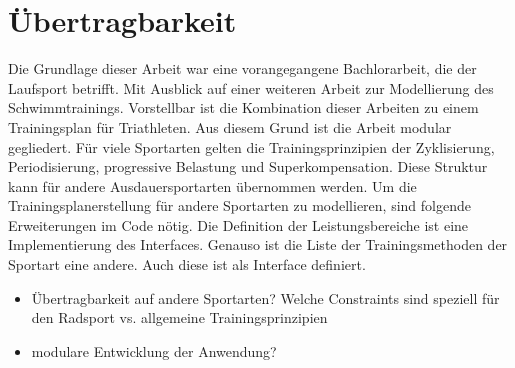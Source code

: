 \section{Übertragbarkeit}
Die Grundlage dieser Arbeit war eine vorangegangene Bachlorarbeit, die der Laufsport betrifft. Mit Ausblick auf einer weiteren Arbeit zur Modellierung des Schwimmtrainings. Vorstellbar ist die Kombination dieser Arbeiten zu einem Trainingsplan für Triathleten. 
Aus diesem Grund ist die Arbeit modular gegliedert.
Für viele Sportarten gelten die Trainingsprinzipien der Zyklisierung, Periodisierung, progressive Belastung und Superkompensation. Diese Struktur kann für andere Ausdauersportarten übernommen werden. Um die Trainingsplanerstellung für andere Sportarten zu modellieren, sind folgende Erweiterungen im Code nötig.
Die Definition der Leistungsbereiche ist eine Implementierung des Interfaces. Genauso ist die Liste der Trainingsmethoden der Sportart eine andere. Auch diese ist als Interface definiert. 
\begin{itemize}
    \item Übertragbarkeit auf andere Sportarten? Welche Constraints sind speziell für den Radsport vs. allgemeine Trainingsprinzipien
    \item modulare Entwicklung der Anwendung?
\end{itemize}